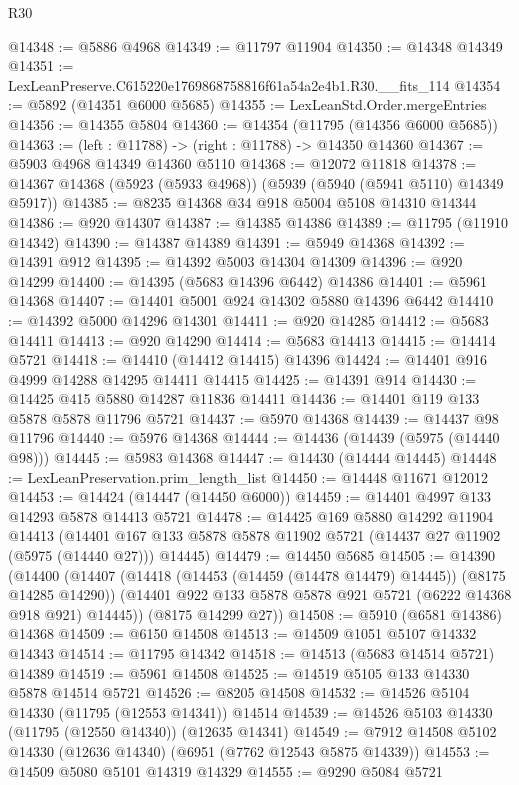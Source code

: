 \begin{lexlean}{R30}
\begin{coremodule}
@14348 := @5886 @4968
@14349 := @11797 @11904
@14350 := @14348 @14349
@14351 := LexLeanPreserve.C615220e1769868758816f61a54a2e4b1.R30.__fits_114
@14354 := @5892 (@14351 @6000 @5685)
@14355 := LexLeanStd.Order.mergeEntries
@14356 := @14355 @5804
@14360 := @14354 (@11795 (@14356 @6000 @5685))
@14363 := (left : @11788) -> (right : @11788) -> @14350 @14360
@14367 := @5903 @4968 @14349 @14360 @5110
@14368 := @12072 @11818
@14378 := @14367 @14368 (@5923 (@5933 @4968)) (@5939 (@5940 (@5941 @5110) @14349 @5917))
@14385 := @8235 @14368 @34 @918 @5004 @5108 @14310 @14344
@14386 := @920 @14307
@14387 := @14385 @14386
@14389 := @11795 (@11910 @14342)
@14390 := @14387 @14389
@14391 := @5949 @14368
@14392 := @14391 @912
@14395 := @14392 @5003 @14304 @14309
@14396 := @920 @14299
@14400 := @14395 (@5683 @14396 @6442) @14386
@14401 := @5961 @14368
@14407 := @14401 @5001 @924 @14302 @5880 @14396 @6442
@14410 := @14392 @5000 @14296 @14301
@14411 := @920 @14285
@14412 := @5683 @14411
@14413 := @920 @14290
@14414 := @5683 @14413
@14415 := @14414 @5721
@14418 := @14410 (@14412 @14415) @14396
@14424 := @14401 @916 @4999 @14288 @14295 @14411 @14415
@14425 := @14391 @914
@14430 := @14425 @415 @5880 @14287 @11836 @14411
@14436 := @14401 @119 @133 @5878 @5878 @11796 @5721
@14437 := @5970 @14368
@14439 := @14437 @98 @11796
@14440 := @5976 @14368
@14444 := @14436 (@14439 (@5975 (@14440 @98)))
@14445 := @5983 @14368
@14447 := @14430 (@14444 @14445)
@14448 := LexLeanPreservation.prim_length_list
@14450 := @14448 @11671 @12012
@14453 := @14424 (@14447 (@14450 @6000))
@14459 := @14401 @4997 @133 @14293 @5878 @14413 @5721
@14478 := @14425
    @169
    @5880
    @14292
    @11904
    @14413
    (@14401 @167 @133 @5878 @5878 @11902 @5721 (@14437 @27 @11902 (@5975 (@14440 @27))) @14445)
@14479 := @14450 @5685
@14505 := @14390
    (@14400
      (@14407
        (@14418 (@14453 (@14459 (@14478 @14479) @14445)) (@8175 @14285 @14290))
        (@14401 @922 @133 @5878 @5878 @921 @5721 (@6222 @14368 @918 @921) @14445))
      (@8175 @14299 @27))
@14508 := @5910 (@6581 @14386) @14368
@14509 := @6150 @14508
@14513 := @14509 @1051 @5107 @14332 @14343
@14514 := @11795 @14342
@14518 := @14513 (@5683 @14514 @5721) @14389
@14519 := @5961 @14508
@14525 := @14519 @5105 @133 @14330 @5878 @14514 @5721
@14526 := @8205 @14508
@14532 := @14526 @5104 @14330 (@11795 (@12553 @14341)) @14514
@14539 := @14526 @5103 @14330 (@11795 (@12550 @14340)) (@12635 @14341)
@14549 := @7912 @14508 @5102 @14330 (@12636 @14340) (@6951 (@7762 @12543 @5875 @14339))
@14553 := @14509 @5080 @5101 @14319 @14329
@14555 := @9290 @5084 @5721

\end{coremodule}
\end{lexlean}
